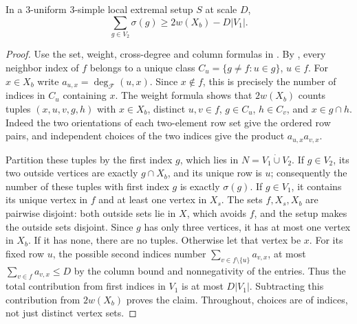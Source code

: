 \begin{lemma}
In a $3$-uniform $3$-simple local extremal setup $S$ at scale $D$,
\[
\sum_{g\in V_2}\sigma(g)\ge2w(X_b)-D|V_1|.
\]
\end{lemma}
\begin{proof}
Use the set, weight, cross-degree and column formulas in
.
By , every neighbor index of
$f$ belongs to a unique class $C_u=\{g\ne f:u\in g\}$, $u\in f$.
For $x\in X_b$ write $a_{u,x}=\deg_{\mathcal F}(u,x)$.
Since $x\notin f$, this is precisely the number of indices in $C_u$
containing $x$. The weight formula shows that $2w(X_b)$ counts tuples
$(x,u,v,g,h)$ with $x\in X_b$, distinct $u,v\in f$,
$g\in C_u$, $h\in C_v$, and $x\in g\cap h$.
Indeed the two orientations of each two-element row set give the
ordered row pairs, and independent choices of the two indices give
the product $a_{u,x}a_{v,x}$.

Partition these tuples by the first index $g$, which lies in
$N=V_1\mathbin{\dot\cup}V_2$. If $g\in V_2$, its two outside vertices
are exactly $g\cap X_b$, and its unique row is $u$; consequently the
number of these tuples with first index $g$ is exactly $\sigma(g)$.
If $g\in V_1$, it contains its unique vertex in $f$ and at least one
vertex in $X_s$. The sets $f,X_s,X_b$ are pairwise disjoint: both
outside sets lie in $X$, which avoids $f$, and the setup makes the
outside sets disjoint. Since $g$ has only three vertices, it has at
most one vertex in $X_b$. If it has none, there are no tuples.
Otherwise let that vertex be $x$. For its fixed row $u$, the possible
second indices number $\sum_{v\in f\setminus\{u\}}a_{v,x}$, at most
$\sum_{v\in f}a_{v,x}\le D$ by the column bound and nonnegativity of
the entries. Thus the total contribution from first indices in $V_1$
is at most $D|V_1|$. Subtracting this contribution from $2w(X_b)$
proves the claim. Throughout, choices are of indices, not just distinct
vertex sets.
\end{proof}
